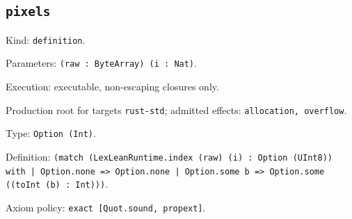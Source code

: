 \documentclass[11pt]{article}
\begin{document}
\subsection*{\texttt{pixels}}
\noindent Kind: \texttt{definition}.\par
\noindent Parameters: \texttt{(raw : ByteArray) (i : Nat)}.\par
\noindent Execution: executable, non-escaping closures only.\par
\noindent Production root for targets \texttt{rust-std}; admitted effects: \texttt{allocation, overflow}.\par
\noindent Type: \texttt{Option (Int)}.\par
\noindent Definition: \texttt{(match (LexLeanRuntime.index (raw) (i) : Option (UInt8)) with | Option.none => Option.none | Option.some b => Option.some ((toInt (b) : Int)))}.\par
\noindent Axiom policy: \texttt{exact [Quot.sound, propext]}.\par
\end{document}
